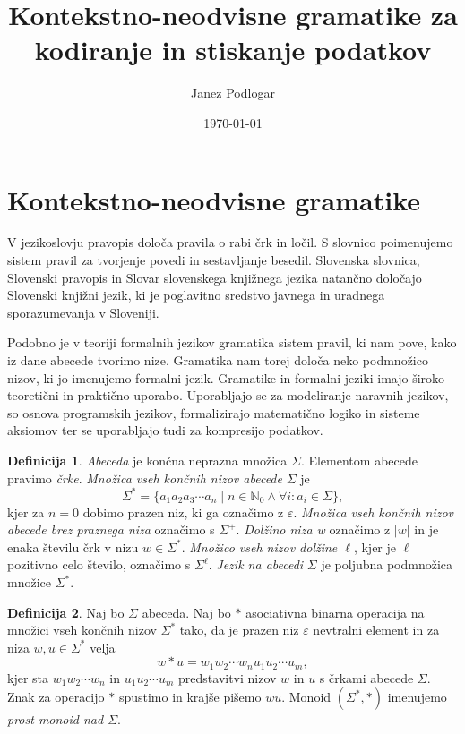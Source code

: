 \documentclass{amsart}
\title{Kontekstno-neodvisne gramatike za kodiranje in stiskanje podatkov}
\author{Janez Podlogar}
\date{\today}
\newcommand{\N}{\mathbb{N}}
\theoremstyle{definition}
\newtheorem{definicija}{Definicija}[section]
\theoremstyle{plain} %
\begin{document}




\maketitle

\section{Kontekstno-neodvisne gramatike}

V jezikoslovju pravopis določa pravila o rabi črk in ločil. S slovnico poimenujemo sistem pravil za tvorjenje
povedi in sestavljanje besedil. Slovenska slovnica, Slovenski pravopis in Slovar slovenskega knjižnega jezika
natančno določajo Slovenski knjižni jezik, ki je poglavitno sredstvo javnega in uradnega sporazumevanja v Sloveniji.


Podobno je v teoriji formalnih jezikov gramatika sistem pravil, ki nam pove, kako iz dane abecede tvorimo nize. Gramatika nam torej določa
neko podmnožico nizov, ki jo imenujemo formalni jezik. Gramatike in formalni jeziki imajo široko teoretični in praktično
uporabo. Uporabljajo se za modeliranje naravnih jezikov, so osnova programskih jezikov, formalizirajo matematično logiko in
sisteme aksiomov ter se uporabljajo tudi za kompresijo podatkov.

\begin{definicija}

    \textit{Abeceda} je končna neprazna množica $ \Sigma $. Elementom abecede pravimo \textit{črke}.
    \textit{Množica vseh končnih nizov abecede} $ \Sigma $ je
    \[
        \Sigma^* = \{ a_1 a_2 a_3 \cdots a_n \mid n \in \N_0 \land \forall i: a_i \in \Sigma \}, 
    \]
    kjer za $ n = 0 $ dobimo prazen niz, ki ga označimo z $ \varepsilon $.
    \textit{Množica vseh končnih nizov abecede brez praznega niza} označimo s $ \Sigma^+ $.
    \textit{Dolžino niza w} označimo z $ |w| $ in je enaka številu črk v nizu $ w \in \Sigma^* $.
    \textit{Množico vseh nizov dolžine $ \ell $}, kjer je $ \ell $ pozitivno celo število, označimo s $ \Sigma^\ell $.
    \textit{Jezik na abecedi} $ \Sigma $ je poljubna podmnožica množice $ \Sigma^* $.
    

\end{definicija}

\begin{definicija}
    
    Naj bo $ \Sigma $ abeceda. Naj bo $ * $ asociativna binarna operacija na množici vseh končnih nizov $ \Sigma^* $
    tako, da je prazen niz $ \varepsilon $ nevtralni element in za niza $ w, u \in \Sigma^* $ velja
    \[
        w*u = w_1w_2 \cdots w_nu_1u_2 \cdots u_m,
    \]
    kjer sta $ w_1w_2 \cdots w_n $ in $ u_1u_2 \cdots u_m $ predstavitvi nizov $ w $ in $ u $ s črkami abecede $ \Sigma $.
    Znak za operacijo $ * $ spustimo in krajše pišemo $ wu $. Monoid $ (\Sigma^*, *) $ imenujemo 
    \textit{prost monoid nad $ \Sigma $}.

\end{definicija}
\end{document}
